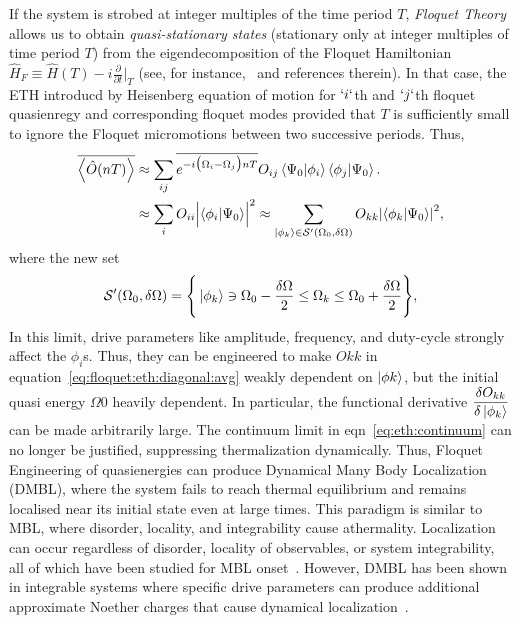 \documentclass[%
reprint,
superscriptaddress,
amsmath,amssymb,
aps,
prb,
]{revtex4-2}
\begin{document}
	 If the system is strobed at integer multiples of the time period $T$, \emph{Floquet Theory} allows us to obtain \textit{quasi-stationary states} (stationary only at integer multiples of time period $T$) from the eigendecomposition of the Floquet Hamiltonian $\hat{H}_F\equiv \hat{H}(T) - i \frac{\partial}{\partial t}\vert_T$ (see, for instance,~\cite{reichl_transition_2021, bukov2014} and references therein). In that case, the ETH introducd by Heisenberg equation of motion for $`i`$th and $`j`$th  floquet quasienregy and corresponding floquet modes provided that $T$ is sufficiently small to ignore the Floquet micromotions between two successive periods. Thus,
\begin{align}
	\overline{\ev{\hat{O}(nT)}} &\approx \sum_{ij}\overline{e^{-i\big(\Omega_i-\Omega_j\big)nT}}O_{ij} \ip{\Psi_0}{\phi_i}\ip{\phi_j}{\Psi_0}.\nonumber\\
	&\approx\sum_i O_{ii} \abs\Big{ \ip{\phi_i}{\Psi_0}}^2\approx \sum_{\ket{\phi_k}\in \mathcal{S}^\prime(\Omega_0, \delta \Omega)}O_{kk}\abs{\ip{\phi_k}{\Psi_0}}^2,
	\label{eq:floquet:eth:diagonal:avg}
\end{align}
where the new set
\begin{equation}
	\mathcal{S}^\prime(\Omega_0, \delta \Omega) = \Bigg\{\ket{\phi_k}\ni \Omega_0-\frac{\delta \Omega}{2}\leq \Omega_k \leq \Omega_0+\frac{\delta \Omega}{2}\Bigg\},\nonumber
\end{equation}
In this limit, drive parameters like amplitude, frequency, and duty-cycle strongly affect the $\phi_i$s. Thus, they can be engineered to make $O {kk}$ in equation~\ref{eq:floquet:eth:diagonal:avg} weakly dependent on $\ket{\phi k}$, but the initial quasi energy $\Omega 0$ heavily dependent. In particular,  the functional derivative $\displaystyle\frac{\var{O_{kk}}}{\var{\ket{\phi_k}}}$ can be made arbitrarily large.  The continuum limit in eqn~\ref{eq:eth:continuum} can no longer be justified, suppressing thermalization dynamically. Thus, Floquet Engineering of quasienergies can produce Dynamical Many Body Localization (DMBL), where the system fails to reach thermal equilibrium and remains localised near its initial state even at large times. This paradigm is similar to MBL, where disorder, locality, and integrability cause athermality. Localization can occur regardless of disorder, locality of observables, or system integrability, all of which have been studied for MBL onset~\cite{Sougata2023,Fabien2018,garratt_resonant_2022}. However, DMBL has been shown in integrable systems where specific drive parameters can produce additional approximate Noether charges that cause dynamical localization~\cite{roy_fate_2015}.
\end{document}
